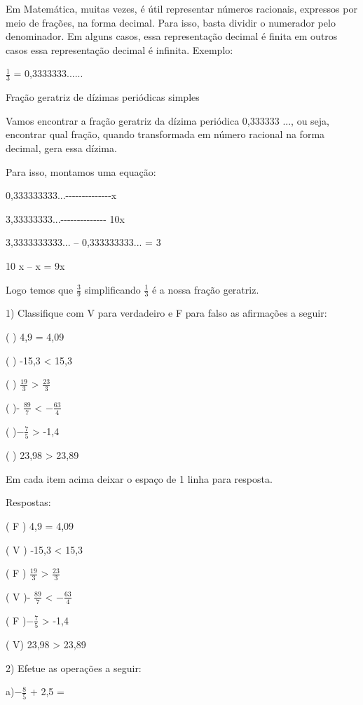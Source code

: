 {Em Matemática, muitas vezes, é útil representar números racionais,
expressos por meio de frações, na forma decimal. Para isso, basta
dividir o numerador pelo denominador. Em alguns casos, essa
representação decimal é finita em outros casos essa representação
decimal é infinita. Exemplo:

\(\frac{1}{3}\) = 0,3333333......

Fração geratriz de dízimas periódicas simples

Vamos encontrar a fração geratriz da dízima periódica 0,333333 ..., ou
seja, encontrar qual fração, quando transformada em número racional na
forma decimal, gera essa dízima.

Para isso, montamos uma equação:

0,333333333...-\/-\/-\/-\/-\/-\/-\/-\/-\/-\/-\/-\/-\/-x

3,33333333...-\/-\/-\/-\/-\/-\/-\/-\/-\/-\/-\/-\/-\/- 10x

3,3333333333... -- 0,333333333... = 3

10 x -- x = 9x

Logo temos que \(\frac{3}{9}\) simplificando \(\frac{1}{3}\) é a nossa
fração geratriz.


1) Classifique com V para verdadeiro e F para falso as afirmações a
seguir:

( ) 4,9 = 4,09

( ) -15,3 \textless{} 15,3

( ) \(\frac{19}{3}\) \textgreater{} \(\frac{23}{3}\)

( )- \(\frac{89}{7}\) \textless{} \(- \frac{63}{4}\)

( )\(- \frac{7}{5}\) \textgreater{} -1,4

( ) 23,98 \textgreater{} 23,89

Em cada item acima deixar o espaço de 1 linha para resposta.

Respostas:

( F ) 4,9 = 4,09

( V ) -15,3 \textless{} 15,3

( F ) \(\frac{19}{3}\) \textgreater{} \(\frac{23}{3}\)

( V )- \(\frac{89}{7}\) \textless{} \(- \frac{63}{4}\)

( F )\(- \frac{7}{5}\) \textgreater{} -1,4

( V) 23,98 \textgreater{} 23,89

2) Efetue as operações a seguir:

a)\(- \frac{8}{5}\) + 2,5 =

}
